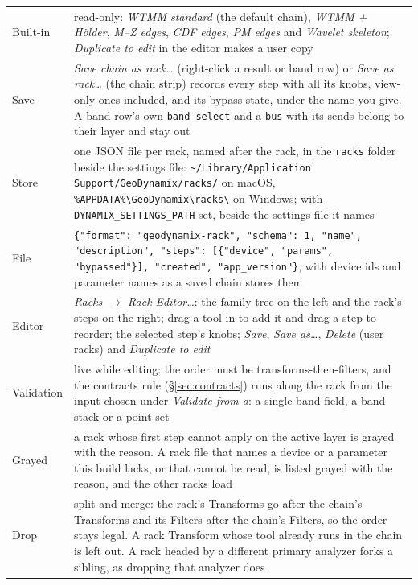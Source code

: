 \documentclass[10pt]{article}
\newcommand{\dev}[1]{\texttt{#1}}
\begin{document}
\begin{longtable}{>{\raggedright\arraybackslash}p{}>{\raggedright\arraybackslash}p{}}
\toprule
Built-in & read-only: \emph{WTMM standard} (the default chain), \emph{WTMM + H\"older},
           \emph{M--Z edges}, \emph{CDF edges}, \emph{PM edges} and \emph{Wavelet skeleton};
           \emph{Duplicate to edit} in the editor makes a user copy \\
Save & \emph{Save chain as rack\ldots} (right-click a result or band row) or \emph{Save as
       rack\ldots} (the chain strip) records every step with all its knobs, view-only ones
       included, and its bypass state, under the name you give. A band row's own
       \dev{band\_select} and a \dev{bus} with its sends belong to their layer and stay out \\
Store & one JSON file per rack, named after the rack, in the \texttt{racks} folder beside the
        settings file: \texttt{\textasciitilde/Library/Application Support/GeoDynamix/racks/}
        on macOS, \texttt{\%APPDATA\%\textbackslash GeoDynamix\textbackslash racks\textbackslash}
        on Windows; with \texttt{DYNAMIX\_SETTINGS\_PATH} set, beside the settings file it
        names \\
File & \texttt{\{"format": "geodynamix-rack", "schema": 1, "name", "description", "steps":
       [\{"device", "params", "bypassed"\}], "created", "app\_version"\}}, with device ids and
       parameter names as a saved chain stores them \\
Editor & \emph{Racks $\to$ Rack Editor\ldots}: the family tree on the left and the rack's steps
         on the right; drag a tool in to add it and drag a step to reorder; the selected step's
         knobs; \emph{Save}, \emph{Save as\ldots}, \emph{Delete} (user racks) and
         \emph{Duplicate to edit} \\
Validation & live while editing: the order must be transforms-then-filters, and the contracts
             rule (\S\ref{sec:contracts}) runs along the rack from the input chosen under
             \emph{Validate from a}: a single-band field, a band stack or a point set \\
Grayed & a rack whose first step cannot apply on the active layer is grayed with the reason. A
         rack file that names a device or a parameter this build lacks, or that cannot be
         read, is listed grayed with the reason, and the other racks load \\
Drop & split and merge: the rack's Transforms go after the chain's Transforms and its Filters
       after the chain's Filters, so the order stays legal. A rack Transform whose tool already
       runs in the chain is left out. A rack headed by a different primary analyzer forks a
       sibling, as dropping that analyzer does \\
\bottomrule
\end{longtable}
\end{document}
